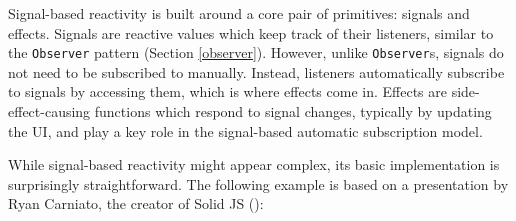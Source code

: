 \documentclass[
  openany]{book}
\theoremstyle{definition}
\theoremstyle{definition}
\theoremstyle{definition}
\theoremstyle{definition}
\theoremstyle{remark}
\begin{document}
Signal-based reactivity is built around a core pair of primitives: signals and effects. Signals are reactive values which keep track of their listeners, similar to the \texttt{Observer} pattern (Section \ref{observer}). However, unlike \texttt{Observer}s, signals do not need to be subscribed to manually. Instead, listeners automatically subscribe to signals by accessing them, which is where effects come in. Effects are side-effect-causing functions which respond to signal changes, typically by updating the UI, and play a key role in the signal-based automatic subscription model.

While signal-based reactivity might appear complex, its basic implementation is surprisingly straightforward. The following example is based on a presentation by Ryan Carniato, the creator of Solid JS ():
\end{document}
